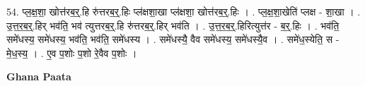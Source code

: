 \documentclass[17pt]{extarticle}
\begin{document}
54. प्ल॒क्ष॒शा॒ खोत्त॑रब॒र्॒.हि रु॑त्तरब॒र्॒.हिः प्ल॑क्षशा॒खा प्ल॑क्षशा॒ खोत्त॑रब॒र्॒.हिः । . प्ल॒क्ष॒शा॒खेति॑ प्लक्ष - शा॒खा । . उ॒त्त॒र॒ब॒र्॒.हिर् भव॑ति॒ भव॑ त्युत्तरब॒र्॒.हि रु॑त्तरब॒र्॒.हिर् भव॑ति । . उ॒त्त॒र॒ब॒र्॒.हिरित्युत्त॑र - ब॒र्॒.हिः । . भव॑ति॒ समे॑धस्य॒ समे॑धस्य॒ भव॑ति॒ भव॑ति॒ समे॑धस्य । . समे॑धस्यै॒ वैव समे॑धस्य॒ समे॑धस्यै॒व । . समे॑ध॒स्येति॒ स - मे॒ध॒स्य॒ । . ए॒व प॒शोः प॒शो रे॒वैव प॒शोः । \newline

\textbf{Ghana Paata } \newline
\end{document}

